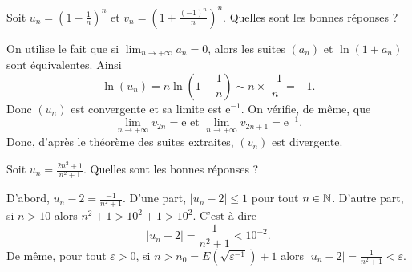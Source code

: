 \begin{question}
Soit $\displaystyle u_n=\left(1-\frac{1}{n}\right)^n$ et $\displaystyle v_n=\left(1+\frac{(-1)^{n}}{n}\right)^n$. Quelles sont les bonnes réponses ?
\begin{answers}  
\end{answers}
\begin{explanations}
On utilise le fait que si $\displaystyle \lim _{n\to +\infty}a_n=0$, alors les suites $(a_n)$ et $\ln (1+a_n)$ sont équivalentes. Ainsi 
$$\ln (u_n)=n\ln \left(1-\frac{1}{n}\right)\sim n\times \frac{-1}{n}=-1.$$
Donc $(u_n)$ est convergente et sa limite est $\mathrm{e}^{-1}$. On vérifie, de même, que
$$\displaystyle \lim _{n\to +\infty}v_{2n}=\mathrm{e}\mbox{ et }\lim _{n\to +\infty}v_{2n+1}=\mathrm{e}^{-1}.$$
Donc, d'après le théorème des suites extraites, $(v_n)$ est divergente.
\end{explanations}
\end{question}



\begin{question}
Soit $\displaystyle u_n=\frac{2n^2+1}{n^2+1}$. Quelles sont les bonnes réponses ?
\begin{answers}
\end{answers}
\begin{explanations}
D'abord, $\displaystyle u_n-2=\frac{-1}{n^2+1}$. D'une part, $\displaystyle |u_n-2|\leq 1$ pour tout $n\in \mathbb{N}$. D'autre part, si $n>10$ alors $\displaystyle n^2+1>10^2+1>10^2$. C'est-à-dire
$$|u_n-2|=\frac{1}{n^2+1}<10^{-2}.$$
De même, pour tout $\varepsilon >0$, si $n>n_0=E\left(\sqrt{\varepsilon ^{-1}}\right)+1$ alors $\displaystyle |u_n-2|=\frac{1}{n^2+1}<\varepsilon$.
\end{explanations}
\end{question}



